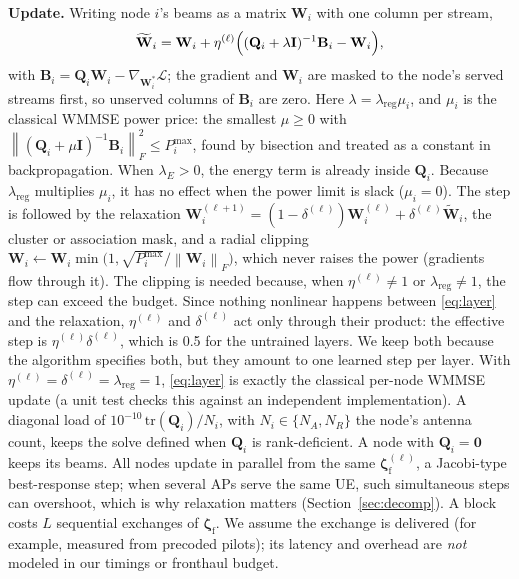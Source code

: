 \documentclass[conference]{IEEEtran}
\newcommand{\norm}[1]{\left\lVert #1 \right\rVert}
\newcommand{\zf}{\boldsymbol{\zeta}_{\mathrm{f}}}
\newcommand{\Loss}{\mathcal{L}}
\begin{document}
\textbf{Update.} Writing node $i$'s beams as a matrix $\mathbf{W}_i$ with one
column per stream,
\begin{equation}
\widetilde{\mathbf{W}}_i = \mathbf{W}_i + \eta^{(\ell)}\Bigl(
(\mathbf{Q}_i + \lambda\mathbf{I})^{-1}\mathbf{B}_i - \mathbf{W}_i\Bigr),
\label{eq:layer}
\end{equation}
with $\mathbf{B}_i = \mathbf{Q}_i\mathbf{W}_i - \nabla_{\mathbf{W}_i^{*}}
\Loss$; the gradient and $\mathbf{W}_i$ are masked to the node's served
streams first, so unserved columns of $\mathbf{B}_i$ are zero. Here
$\lambda = \lambda_{\mathrm{reg}}\mu_i$, and $\mu_i$ is the classical WMMSE
power price: the smallest $\mu\ge0$ with
$\norm{(\mathbf{Q}_i+\mu\mathbf{I})^{-1}\mathbf{B}_i}_F^2\le P^{\max}_i$,
found by bisection and treated as a constant in backpropagation. When
$\lambda_E>0$, the energy term is already inside $\mathbf{Q}_i$. Because
$\lambda_{\mathrm{reg}}$ multiplies $\mu_i$, it has no effect when the power
limit is slack ($\mu_i=0$). The step is
followed by the relaxation $\mathbf{W}_i^{(\ell+1)} =
(1-\delta^{(\ell)})\mathbf{W}_i^{(\ell)} + \delta^{(\ell)}
\widetilde{\mathbf{W}}_i$, the cluster or association mask, and a radial
clipping $\mathbf{W}_i\leftarrow\mathbf{W}_i\min\bigl(1,\sqrt{P^{\max}_i}/
\norm{\mathbf{W}_i}_F\bigr)$, which never raises the power (gradients flow
through it). The clipping is needed because, when
$\eta^{(\ell)}\ne1$ or $\lambda_{\mathrm{reg}}\ne1$, the step can exceed the
budget. Since nothing nonlinear happens between \eqref{eq:layer} and the
relaxation, $\eta^{(\ell)}$ and $\delta^{(\ell)}$ act only through their
product: the effective step is $\eta^{(\ell)}\delta^{(\ell)}$, which is 0.5
for the untrained layers. We keep both because the algorithm specifies both,
but they amount to one learned step per layer. With $\eta^{(\ell)} = \delta^{(\ell)} = \lambda_{\mathrm{reg}} = 1$,
\eqref{eq:layer} is exactly the classical per-node WMMSE update (a unit test
checks this against an independent implementation). A diagonal load of
$10^{-10}\,\mathrm{tr}(\mathbf{Q}_i)/N_i$, with $N_i\in\{N_A,N_R\}$ the
node's antenna count, keeps the solve defined when $\mathbf{Q}_i$ is
rank-deficient. A node with $\mathbf{Q}_i=\mathbf{0}$ keeps its beams. All
nodes update in parallel from the same $\zf^{(\ell)}$, a Jacobi-type
best-response step; when several APs serve the same UE, such simultaneous
steps can overshoot, which is why relaxation matters
(Section~\ref{sec:decomp}). A block costs $L$ sequential exchanges of $\zf$. We assume the exchange is delivered (for
example, measured from precoded pilots); its latency and overhead are
\emph{not} modeled in our timings or fronthaul budget.
\end{document}
